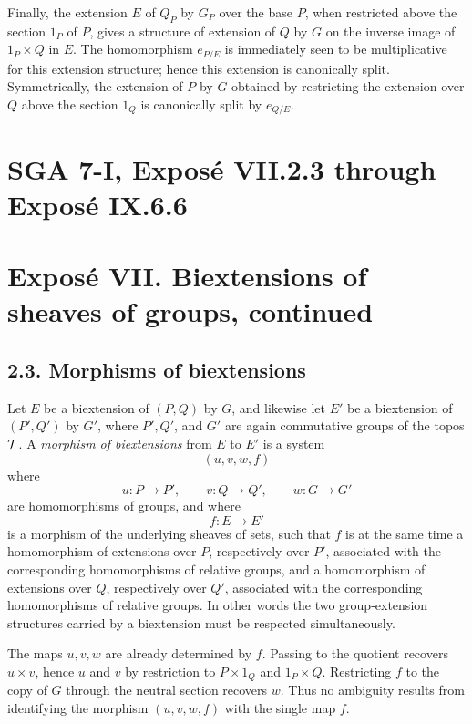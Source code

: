 \documentclass[11pt]{article}
\theoremstyle{plain}
\theoremstyle{definition}
\theoremstyle{remark}
\begin{document}
Finally, the extension $E$ of $Q_P$ by $G_P$ over the base $P$, when restricted above the section $1_P$ of $P$, gives a structure of extension of $Q$ by $G$ on the inverse image of $1_P\times Q$ in $E$. The homomorphism $e_{P/E}$ is immediately seen to be multiplicative for this extension structure; hence this extension is canonically split. Symmetrically, the extension of $P$ by $G$ obtained by restricting the extension over $Q$ above the section $1_Q$ is canonically split by $e_{Q/E}$.


\clearpage
\section*{SGA 7-I, Exposé VII.2.3 through Exposé IX.6.6}

\section*{Exposé VII. Biextensions of sheaves of groups, continued}

\subsection*{2.3. Morphisms of biextensions}

Let \(E\) be a biextension of \((P,Q)\) by \(G\), and likewise let \(E'\) be a
biextension of \((P',Q')\) by \(G'\), where \(P',Q'\), and \(G'\) are again
commutative groups of the topos \(\mathcal T\). A \emph{morphism of biextensions}
from \(E\) to \(E'\) is a system
\[
(u,v,w,f)
\]
where
\[
u:P\longrightarrow P',\qquad v:Q\longrightarrow Q',
        \qquad w:G\longrightarrow G'
\]
are homomorphisms of groups, and where
\[
f:E\longrightarrow E'
\]
is a morphism of the underlying sheaves of sets, such that \(f\) is at the same
time a homomorphism of extensions over \(P\), respectively over \(P'\), associated
with the corresponding homomorphisms of relative groups, and a homomorphism of
extensions over \(Q\), respectively over \(Q'\), associated with the corresponding
homomorphisms of relative groups. In other words the two group-extension
structures carried by a biextension must be respected simultaneously.

The maps \(u,v,w\) are already determined by \(f\). Passing to the quotient
recovers \(u\times v\), hence \(u\) and \(v\) by restriction to
\(P\times 1_Q\) and \(1_P\times Q\). Restricting \(f\) to the copy of \(G\)
through the neutral section recovers \(w\). Thus no ambiguity results from
identifying the morphism \((u,v,w,f)\) with the single map \(f\).
\end{document}
